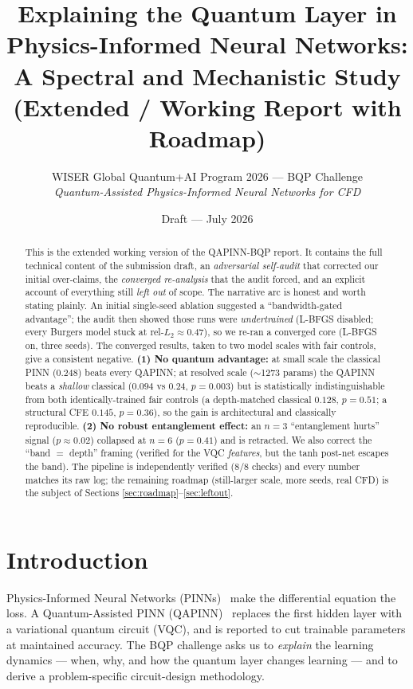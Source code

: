 \documentclass[11pt]{article}
\title{\textbf{Explaining the Quantum Layer in Physics-Informed Neural Networks:\\
A Spectral and Mechanistic Study \\[2pt] \large (Extended / Working Report with Roadmap)}}
\author{WISER Global Quantum+AI Program 2026 --- BQP Challenge\\
\emph{Quantum-Assisted Physics-Informed Neural Networks for CFD}}
\date{Draft --- July 2026}
\begin{document}
\maketitle

\begin{abstract}
This is the extended working version of the QAPINN-BQP report. It contains the
full technical content of the submission draft, an \emph{adversarial self-audit}
that corrected our initial over-claims, the \emph{converged re-analysis} that the
audit forced, and an explicit account of everything still \emph{left out} of scope.
The narrative arc is honest and worth stating plainly. An initial single-seed
ablation suggested a ``bandwidth-gated advantage''; the audit then showed those
runs were \emph{undertrained} (L-BFGS disabled; every Burgers model stuck at
rel-$L_2\approx0.47$), so we re-ran a converged core (L-BFGS on, three seeds).
The converged results, taken to two model scales with fair controls, give a
consistent negative. \textbf{(1) No quantum advantage:} at small scale the classical
PINN ($0.248$) beats every QAPINN; at resolved scale ($\sim$1273 params) the QAPINN
beats a \emph{shallow} classical ($0.094$ vs $0.24$, $p=0.003$) but is
statistically indistinguishable from both identically-trained fair controls (a
depth-matched classical $0.128$, $p=0.51$; a structural CFE $0.145$, $p=0.36$), so
the gain is architectural and
classically reproducible. \textbf{(2) No robust entanglement effect:} an $n=3$
``entanglement hurts'' signal ($p\approx0.02$) collapsed at $n=6$ ($p=0.41$) and is
retracted. We also correct the ``band $=$ depth'' framing (verified for the VQC
\emph{features}, but the tanh post-net escapes the band). The pipeline is
independently verified (8/8 checks) and every number matches its raw log; the
remaining roadmap (still-larger scale, more seeds, real CFD) is the subject of Sections
\ref{sec:roadmap}--\ref{sec:leftout}.
\end{abstract}

\tableofcontents
\newpage

\section{Introduction}
Physics-Informed Neural Networks (PINNs)~\cite{raissi} make the differential
equation the loss. A Quantum-Assisted PINN (QAPINN)~\cite{qapinn} replaces the
first hidden layer with a variational quantum circuit (VQC), and is reported to cut
trainable parameters at maintained accuracy. The BQP challenge asks us to
\emph{explain} the learning dynamics --- when, why, and how the quantum layer
changes learning --- and to derive a problem-specific circuit-design methodology.
\end{document}
